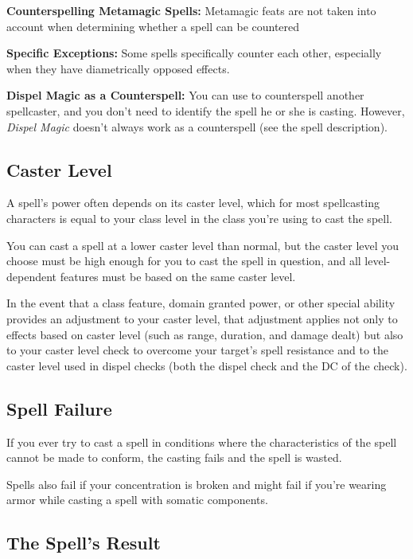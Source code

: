 \textbf{Counterspelling Metamagic Spells:} Metamagic feats are not taken into account 
when determining whether a spell can be countered

\textbf{Specific Exceptions:} Some spells specifically counter each other, especially 
when they have diametrically opposed effects.

\textbf{Dispel Magic as a Counterspell:} You can use 
to counterspell another spellcaster, and you don't need to identify the 
spell he or she is casting. However, \textit{Dispel Magic} doesn't always work 
as a counterspell (see the spell description).

\subsection{Caster Level}

A spell's power often depends on its caster level, which for most spellcasting 
characters is equal to your class level in the class you're using to cast the spell. 

You can cast a spell at a lower caster level than normal, but the caster level 
you choose must be high enough for you to cast the spell in question, and all level-dependent 
features must be based on the same caster level. 

In the event that a class feature, domain granted power, or other special ability 
provides an adjustment to your caster level, that adjustment applies not only to 
effects based on caster level (such as range, duration, and damage dealt) but also 
to your caster level check to overcome your target's spell resistance and to the 
caster level used in dispel checks (both the dispel check and the DC of the check). 

\subsection{Spell Failure}

If you ever try to cast a spell in conditions where the characteristics of the 
spell cannot be made to conform, the casting fails and the spell is wasted.

Spells also fail if your concentration is broken and might fail if you're wearing 
armor while casting a spell with somatic components.

\subsection{The Spell's Result}

